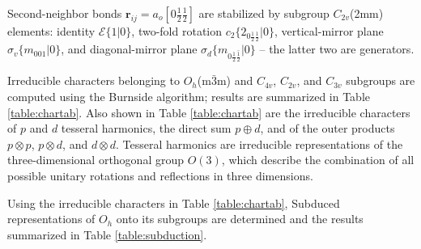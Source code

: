 \documentclass[twocolumn,showpacs,preprintnumbers,superscriptaddress,prb,floatfix,aps,10pt]{revtex4-1}
\renewcommand{\vec}[1]{\ensuremath{\mathbf{#1}}}
\newcommand*{\id}{\mathcal{E}}
\newcommand*{\bondvec}{\vec{r}_{ij}}
\newcommand{\seitz}[2]{\{#1|#2\}}
\begin{document}
Second-neighbor bonds $\bondvec = a_o[0\frac{1}{2}\frac{1}{2}]$ are stabilized by subgroup $C_{2v}$(2mm) elements: identity $\id \seitz{1}{0}$, two-fold rotation $c_2 \seitz{ 2_{0\frac{1}{2}\frac{1}{2}} }{0}$, vertical-mirror plane $\sigma_v \seitz{m_{001}}{0}$, and diagonal-mirror plane $\sigma_d \seitz{m_{0\frac{1}{2}\bar{\frac{1}{2}}}}{0}$ -- the latter two are generators.


Irreducible characters belonging to $O_h$(m$\bar{3}$m) and $C_{4v}$, $C_{2v}$, and $C_{3v}$ subgroups are computed using the Burnside algorithm; results are summarized in Table \ref{table:chartab}. Also shown in Table \ref{table:chartab} are the irreducible characters of $p$ and $d$ tesseral harmonics, the direct sum $p \oplus d$, and of the outer products $p \otimes p$, $p \otimes d$, and $d \otimes d$. Tesseral harmonics are irreducible representations of the three-dimensional orthogonal group $O(3)$, which describe the combination of all possible unitary rotations and reflections in three dimensions. 


Using the irreducible characters in Table \ref{table:chartab}, Subduced representations of $O_h$ onto its subgroups are determined and the results summarized in Table \ref{table:subduction}. 
\end{document}
